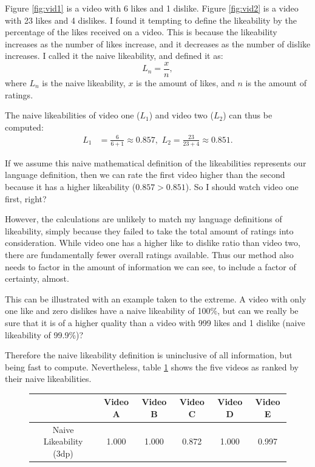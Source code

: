 \documentclass[a4paper,11pt]{article}
\begin{document}
Figure \ref{fig:vid1} is a video with 6 likes and 1 dislike. Figure \ref{fig:vid2} is a video with 23 likes and 4 dislikes. I found it tempting to define the likeability by the percentage of the likes received on a video. This is because the likeability increases as the number of likes increase, and it decreases as the number of dislike increases. I called it the naive likeability, and defined it as:
\[
L_n = \frac{x}{n},
\]
where $L_n$ is the naive likeability, $x$ is the amount of likes, and $n$ is the amount of ratings.

The naive likeabilities of video one ($L_1$) and video two ($L_2$) can thus be computed:
\begin{align*}
    L_{1} &= \frac{6}{6+1} \approx 0.857, \,\, L_{2} = \frac{23}{23 + 4} \approx 0.851.
\end{align*}

If we assume this naive mathematical definition of the likeabilities represents our language definition, then we can rate the first video higher than the second because it has a higher likeability ($0.857 > 0.851$). So I should watch video one first, right?

However, the calculations are unlikely to match my language definitions of likeability, simply because they failed to take the total amount of ratings into consideration. While video one has a higher like to dislike ratio than video two, there are fundamentally fewer overall ratings available. Thus our method also needs to factor in the amount of information we can see, to include a factor of certainty, almost.

This can be illustrated with an example taken to the extreme. A video with only one like and zero dislikes have a naive likeability of 100\%, but can we really be sure that it is of a higher quality than a video with 999 likes and 1 dislike (naive likeability of 99.9\%)?

Therefore the naive likeability definition is uninclusive of all information, but being fast to compute. Nevertheless, table \ref{tbl:naive} shows the five videos as ranked by their naive likeabilities.

\begin{figure}[H]
    \centering
    \begin{tabular}{c|c|c|c|c|c}
        & Video A & Video B & Video C & Video D & Video E \\
        \hline
        \hline
        Naive Likeability (3dp) & 1.000 & 1.000 & 0.872 & 1.000 & 0.997
    \end{tabular}
    \label{tbl:naive}
\end{figure}
\end{document}
